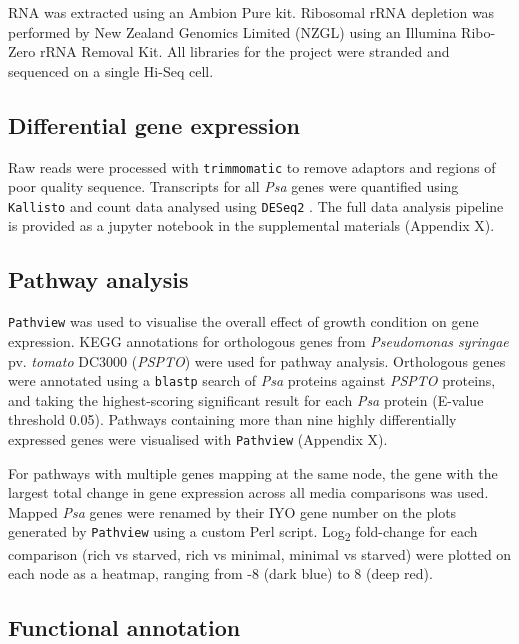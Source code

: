 RNA was extracted using an Ambion Pure kit. Ribosomal rRNA depletion was performed by New Zealand Genomics Limited (NZGL) using an Illumina Ribo-Zero rRNA Removal Kit. All libraries for the project were stranded and sequenced on a single Hi-Seq cell.

\subsection{Differential gene expression}
Raw reads were processed with \texttt{trimmomatic} \citep{Bolger2014-ob} to remove adaptors and regions of poor quality sequence. Transcripts for all \textit{Psa} genes
were quantified using \texttt{Kallisto} \citep{Bray2016-oi} and count data analysed using \texttt{DESeq2} \citep{Love2014-dv}. The full data analysis pipeline is provided as a jupyter notebook in the supplemental materials (Appendix X).

\subsection{Pathway analysis}
\texttt{Pathview} \citep{Luo_Brouwer_2013} was used to visualise the overall effect of growth condition on gene expression. KEGG annotations for orthologous genes from \textit{Pseudomonas syringae} pv. \textit{tomato} DC3000 (\textit{PSPTO}) were used for pathway analysis. Orthologous genes were annotated using a \texttt{blastp} \citep{Altschul1990-dkr} search of \textit{Psa} proteins against \textit{PSPTO} proteins, and taking the highest-scoring significant result for each \textit{Psa} protein (E-value threshold 0.05). Pathways containing more than nine highly differentially expressed genes were visualised with \texttt{Pathview} (Appendix X). 

For pathways with multiple genes mapping at the same node, the gene with the largest total change in gene expression across all media comparisons was used. Mapped \textit{Psa} genes were renamed by their IYO gene number on the plots generated by \texttt{Pathview} using a custom Perl script. Log\textsubscript{2} fold-change for each comparison (rich vs starved, rich vs minimal, minimal vs starved) were plotted on each node as a heatmap, ranging from -8 (dark blue) to 8 (deep red).

\subsection{Functional annotation}

